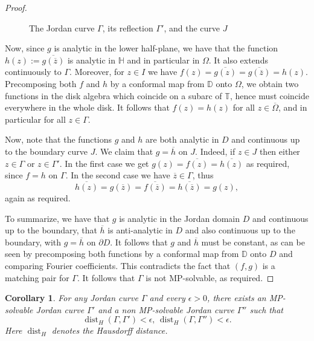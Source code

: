 \documentclass{amsart}
\theoremstyle{plain}
\newtheorem{corollary}[theorem]{Corollary}
\theoremstyle{definition}
\theoremstyle{remark}
\newcommand{\mD}{\mathbb{D}}
\newcommand{\mT}{\mathbb{T}}
\begin{document}
\begin{proof}
\begin{figure}[ht]
    \caption{The Jordan curve $\Gamma$, its reflection $\Gamma'$, and the curve $J$}
    \label{fig:illustrationProof}
\end{figure}
Now, since $g$ is analytic in the lower half-plane, we have that the function $h(z):=\overline{g(\overline{z})}$ is analytic in $\mathbb{H}$ and in particular in $\Omega$. It also extends continuously to $\Gamma$. Moreover, for $z \in I$ we have $f(z)=\overline{g(z)} = \overline{g(\overline{z})} = h(z).$ Precomposing both $f$ and $h$ by a conformal map from $\mD$ onto $\Omega$, we obtain two functions in the disk algebra which coincide on a subarc of $\mT$, hence must coincide everywhere in the whole disk. It follows that $f(z)=h(z)$ for all $z \in \overline{\Omega}$, and in particular for all $z \in \Gamma$.

Now, note that the functions $g$ and $h$ are both analytic in $D$ and continuous up to the boundary curve $J$. We claim that $g=\overline{h}$ on $J$. Indeed, if $z \in J$ then either $z \in \Gamma$ or $z \in \Gamma'$. In the first case we get $g(z)=\overline{f(z)}=\overline{h(z)}$ as required, since $f=h$ on $\Gamma$. In the second case we have $\overline{z} \in \Gamma$, thus
$$
\overline{h(z)} = g(\overline{z}) = \overline{f(\overline{z})} = \overline{h(\overline{z})}=g(z),
$$
again as required.

To summarize, we have that $g$ is analytic in the Jordan domain $D$ and continuous up to the boundary, that $\overline{h}$ is anti-analytic in $D$ and also continuous up to the boundary, with $g=\overline{h}$ on $\partial D$. It follows that $g$ and $\overline{h}$ must be constant, as can be seen by precomposing both functions by a conformal map from $\mD$ onto $D$ and comparing Fourier coefficients. This contradicts the fact that $(f,g)$ is a matching pair for $\Gamma$. It follows that $\Gamma$ is not MP-solvable, as required.
\end{proof}


\begin{corollary}
\label{corollary:dense}
For any Jordan curve $\Gamma$ and every $\epsilon>0$, there exists an MP-solvable Jordan curve $\Gamma'$ and a non MP-solvable Jordan curve $\Gamma''$ such that
$$\operatorname{dist}_H(\Gamma,\Gamma')<\epsilon, \, \operatorname{dist}_H(\Gamma,\Gamma'')<\epsilon. $$
Here $\operatorname{dist}_H$ denotes the Hausdorff distance.
\end{corollary}
\end{document}
